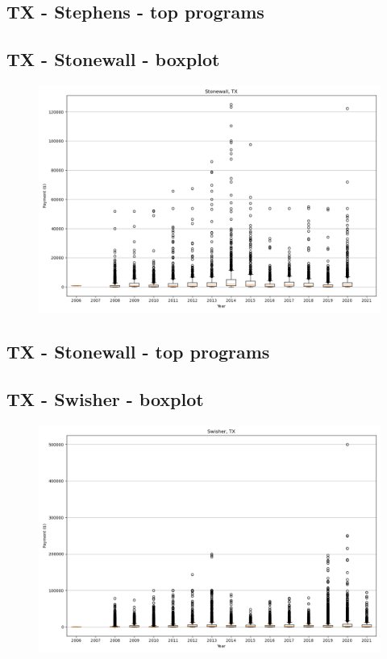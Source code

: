\subsection*{TX - Stephens - top programs}

\newpage
\subsection*{TX - Stonewall - boxplot}
\begin{figure}[h]
\centering
\includegraphics[width=7in]{../output/boxplots/counties/Stonewall-TX_boxplot.png}
\end{figure}


\subsection*{TX - Stonewall - top programs}

\newpage
\subsection*{TX - Swisher - boxplot}
\begin{figure}[h]
\centering
\includegraphics[width=7in]{../output/boxplots/counties/Swisher-TX_boxplot.png}
\end{figure}


